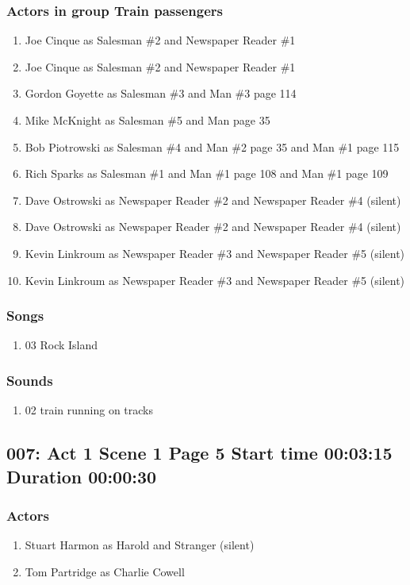 \subsubsection{Actors in group Train passengers}
\begin{enumerate}
\item Joe Cinque as Salesman \#2 and Newspaper Reader \#1
\item Joe Cinque as Salesman \#2 and Newspaper Reader \#1
\item Gordon Goyette as Salesman \#3 and Man \#3 page 114
\item Mike McKnight as Salesman \#5 and Man page 35
\item Bob Piotrowski as Salesman \#4 and Man \#2 page 35 and Man \#1 page 115
\item Rich Sparks as Salesman \#1 and Man \#1 page 108 and Man \#1 page 109
\item Dave Ostrowski as Newspaper Reader \#2 and Newspaper Reader \#4 (silent)
\item Dave Ostrowski as Newspaper Reader \#2 and Newspaper Reader \#4 (silent)
\item Kevin Linkroum as Newspaper Reader \#3 and Newspaper Reader \#5 (silent)
\item Kevin Linkroum as Newspaper Reader \#3 and Newspaper Reader \#5 (silent)
\end{enumerate}

\subsubsection{Songs}
\begin{enumerate}
\item 03 Rock Island
\end{enumerate}\subsubsection{Sounds}
\begin{enumerate}
\item 02 train running on tracks
\end{enumerate}
\subsection{007: Act 1 Scene 1 Page 5 Start time 00:03:15 Duration 00:00:30}

\subsubsection{Actors}
\begin{enumerate}
\item Stuart Harmon as Harold and Stranger (silent)
\item Tom Partridge as Charlie Cowell
\end{enumerate}

